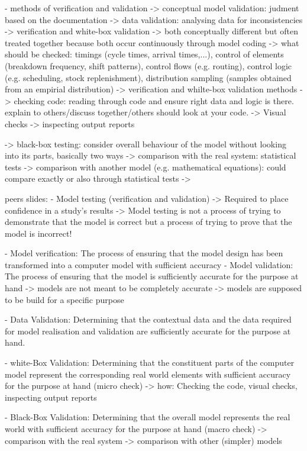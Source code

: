 	- methods of verification and validation
	-> conceptual model validation: judment based on the documentation
	-> data validation: analysing data for inconsistencies
	-> verification and white-box validation
		-> both conceptually different but often treated together because both occur continuously through model coding
		-> what should be checked: timings (cycle times, arrival times,...), control of elements (breakdown frequency, shift patterns), control flows (e.g. routing), control logic (e.g. scheduling, stock replenishment), distribution sampling (samples obtained from an empirial distribution)
	-> verification and whilte-box validation methods
		-> checking code: reading through code and ensure right data and logic is there. explain to others/discuss together/others should look at your code. 
		-> Visual checks
		-> inspecting output reports
		
	-> black-box testing: consider overall behaviour of the model without looking into its parts, basically two ways
		-> comparison with the real system: statistical tests
		-> comparison with another model (e.g. mathematical equations): could compare exactly or also through statistical tests
		-> 
		
peers slides:
	- Model testing (verification and validation)
		-> Required to place confidence in a study's results
		-> Model testing is not a process of trying to demonstrate that the model is correct but a process of trying to prove that the model is incorrect!
		
	- Model verification: The process of ensuring that the model design has been transformed into a computer model with sufficient accuracy
	- Model validation: The process of ensuring that the model is sufficiently accurate for the purpose at hand
		-> models are not meant to be completely accurate
		-> models are supposed to be build for a specific purpose
		
	- Data Validation: Determining that the contextual data and the data required for model realisation and validation are sufficiently accurate for the purpose at hand.

    - white-Box Validation: Determining that the constituent parts of the computer model represent the corresponding real world elements with sufficient accuracy for the purpose at hand (micro check)
    	-> how: Checking the code, visual checks, inspecting output reports
    	
    - Black-Box Validation: Determining that the overall model represents the real world with sufficient accuracy for the purpose at hand (macro check)
    	-> comparison with the real system
    	-> comparison with other (simpler) models
    	
